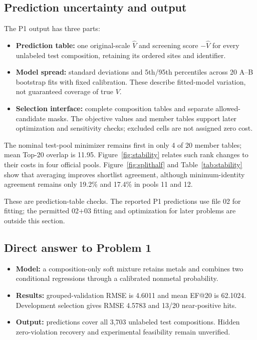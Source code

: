 \subsection{Prediction uncertainty and output}
The P1 output has three parts:
\begin{itemize}
  \item \textbf{Prediction table:} one original-scale $\widehat V$ and screening score $-\widehat V$ for every unlabeled test composition, retaining its ordered sites and identifier.
  \item \textbf{Model spread:} standard deviations and 5th/95th percentiles across 20 A--B bootstrap fits with fixed calibration. These describe fitted-model variation, not guaranteed coverage of true $V$.
  \item \textbf{Selection interface:} complete composition tables and separate allowed-candidate masks. The objective values and member tables support later optimization and sensitivity checks; excluded cells are not assigned zero cost.
\end{itemize}

The nominal test-pool minimizer remains first in only 4 of 20 member tables; mean Top-20 overlap is 11.95. Figure~\ref{fig:stability} relates such rank changes to their costs in four official pools. Figure~\ref{fig:splithalf} and Table~\ref{tab:stability} show that averaging improves shortlist agreement, although minimum-identity agreement remains only 19.2\% and 17.4\% in pools 11 and 12.

These are prediction-table checks. The reported P1 predictions use file 02 for fitting; the permitted 02+03 fitting and optimization for later problems are outside this section.

\subsection{Direct answer to Problem 1}
\begin{itemize}
  \item \textbf{Model:} a composition-only soft mixture retains metals and combines two conditional regressions through a calibrated nonmetal probability.
  \item \textbf{Results:} grouped-validation RMSE is 4.6011 and mean EF@20 is 62.1024. Development selection gives RMSE 4.5783 and 13/20 near-positive hits.
  \item \textbf{Output:} predictions cover all 3,703 unlabeled test compositions. Hidden zero-violation recovery and experimental feasibility remain unverified.
\end{itemize}
